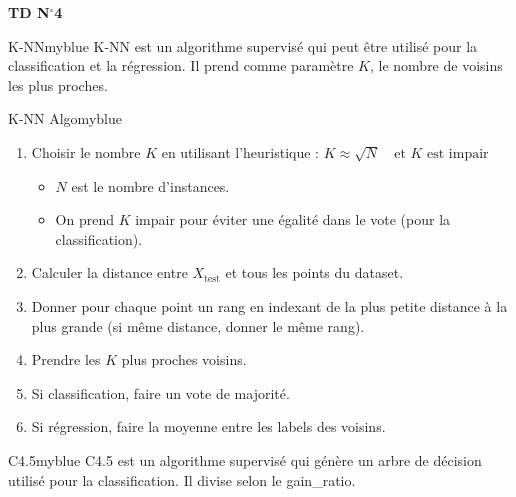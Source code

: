 \documentclass{article}
\newcommand{\tit}[1]{
\begin{center}
    \Large{\textbf{{#1}}}
\end{center}
}
\begin{document}
\tit{TD N\(^{\boldsymbol{\circ}}\)\hspace{0.1cm}4}

\vspace{0.35cm}

\begin{prettyBox}{K-NN}{myblue}
    K-NN est un algorithme supervisé qui peut être utilisé pour la classification et la régression. Il prend comme
    paramètre $K$, le nombre de voisins les plus proches.
\end{prettyBox}


\vspace{0.15cm}

\begin{prettyBox}{K-NN Algo}{myblue}
    \begin{enumerate}
        \setlength{\itemsep}{0pt}
        \item Choisir le nombre \(K\) en utilisant l'heuristique : $K \approx \sqrt{N} \quad \text{et } K \text{ est impair}$
            \begin{itemize}
                \setlength{\itemsep}{0pt}
                \item $N$ est le nombre d'instances.
                \item On prend $K$ impair pour éviter une égalité dans le vote (pour la classification).
            \end{itemize}
        \item Calculer la distance entre $X_{\text{test}}$ et tous les points du dataset.
        \item Donner pour chaque point un rang en indexant de la plus petite distance à la plus grande (si même distance, donner le même rang).
        \item Prendre les $K$ plus proches voisins.
        \item Si classification, faire un vote de majorité.
        \item Si régression, faire la moyenne entre les labels des voisins.
    \end{enumerate}
\end{prettyBox}

\vspace{0.25cm}

\begin{prettyBox}{C4.5}{myblue}
    C4.5 est un algorithme supervisé qui génère un arbre de décision utilisé pour 
    la classification. Il divise selon le gain\_ratio.
\end{prettyBox}
\end{document}
